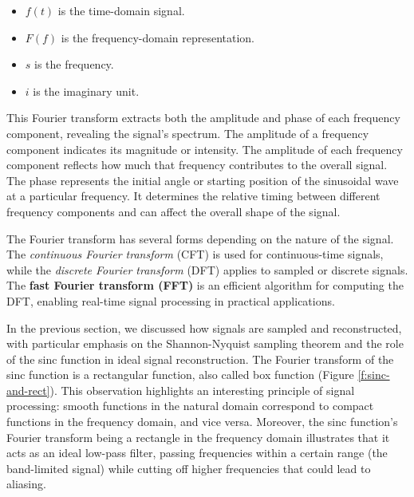 \begin{itemize}
  \item \( f(t) \) is the time-domain signal.
  \item \( F(f) \) is the frequency-domain representation.
  \item \( s \) is the frequency.
  \item \( i \) is the imaginary unit.
\end{itemize}


This Fourier transform extracts both the amplitude and phase of each frequency component, revealing the signal's spectrum. The amplitude of a frequency component indicates its magnitude or intensity. The amplitude of each frequency component reflects how much that frequency contributes to the overall signal. The phase represents the initial angle or starting position of the sinusoidal wave at a particular frequency. It determines the relative timing between different frequency components and can affect the overall shape of the signal.



The Fourier transform has several forms depending on the nature of the signal. The \textit{continuous Fourier transform} (CFT) is used for continuous-time signals, while the \textit{discrete Fourier transform} (DFT) applies to sampled or discrete signals. The \textbf{fast Fourier transform (FFT)} is an efficient algorithm for computing the DFT, enabling real-time signal processing in practical applications.

In the previous section, we discussed how signals are sampled and reconstructed, with particular emphasis on the Shannon-Nyquist sampling theorem and the role of the sinc function in ideal signal reconstruction. The Fourier transform of the sinc function is a rectangular function, also called box function (Figure \ref{f:sinc-and-rect}). This observation highlights an interesting principle of signal processing: smooth functions in the natural domain correspond to compact functions in the frequency domain, and vice versa. Moreover, the sinc function's Fourier transform being a rectangle in the frequency domain illustrates that it acts as an ideal low-pass filter, passing frequencies within a certain range (the band-limited signal) while cutting off higher frequencies that could lead to aliasing.

